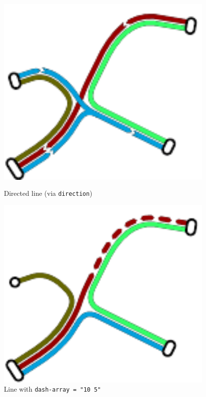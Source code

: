 \documentclass[10pt,a4paper]{article}
\begin{document}
\begin{figure}
  \centering
	\begin{minipage}[b]{0.4\textwidth}
    \includegraphics[width=0.96\textwidth]{test4.pdf}
	\caption{Directed line (via \texttt{direction})}
  \label{directedline}
	\end{minipage}
	\hspace{10mm}
	\begin{minipage}[b]{0.4\textwidth}
	\includegraphics[width=0.96\textwidth]{test_dashed.pdf}
	\caption{Line with \texttt{dash-array = "10 5"}}
  \label{dasharray}
	\end{minipage}

\end{figure}
\end{document}
